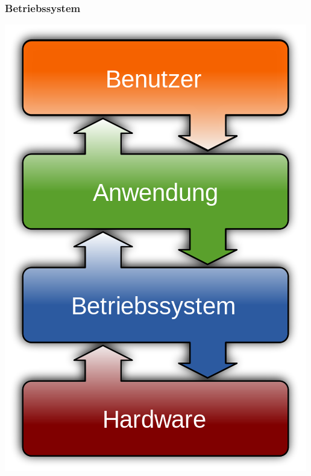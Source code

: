 \documentclass[compress]{beamer}
\begin{document}
\begin{frame}
	\frametitle{Betriebssystem}
	\begin{center}
	\includegraphics[scale=0.25]{media/500px-Operating_system_placement-de.png}
	\end{center}
\end{frame}
\end{document}
